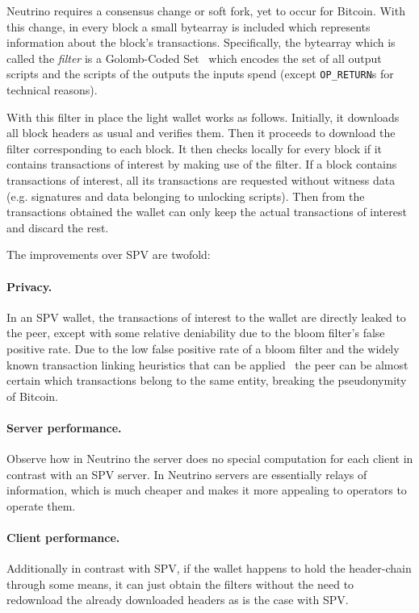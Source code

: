 \documentclass[sigconf]{acmart}
\begin{document}
Neutrino requires a consensus change or soft fork, yet to occur for Bitcoin. With this change, in every block a small bytearray is included which represents information about the block's transactions. Specifically, the bytearray which is called the \emph{filter} is a Golomb-Coded Set~\cite{golomb1966run}
which encodes the set of all output scripts and the scripts of the outputs the inputs spend (except \texttt{OP\_RETURN}s for technical reasons).

With this filter in place the light wallet works as follows. Initially, it downloads all block headers as usual and verifies them. Then it proceeds to download the filter corresponding to each block. It then checks locally for every block if it contains transactions of interest by making use of the filter. If a block contains transactions of interest, all its transactions are requested without witness data (e.g. signatures and data belonging to unlocking scripts). Then from the transactions obtained the wallet can only keep the actual transactions of interest and discard the rest.

The improvements over SPV are twofold:
\paragraph{Privacy.} In an SPV wallet, the transactions of interest to the wallet are directly leaked to the peer, except with some relative deniability due to the bloom filter's false positive rate. Due to the low false positive rate of a bloom filter and the widely known transaction linking heuristics that can be applied~\cite{meiklejohn2013fistful,gervais2014privacy}
the peer can be almost certain which transactions belong to the same entity, breaking the pseudonymity of Bitcoin.
\paragraph{Server performance.} Observe how in Neutrino the server does no special computation for each client in contrast with an SPV server. In Neutrino servers are essentially relays of information, which is much cheaper and makes it more appealing to operators to operate them.
\paragraph{Client performance.} Additionally in contrast with SPV, if the wallet happens to hold the header-chain through some means, it can just obtain the filters without the need to redownload the already downloaded headers as is the case with SPV.
\end{document}
